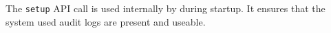 The \verb+setup+ API call is used internally by \Rapture during startup. It ensures that the
system used audit logs are present and useable.
